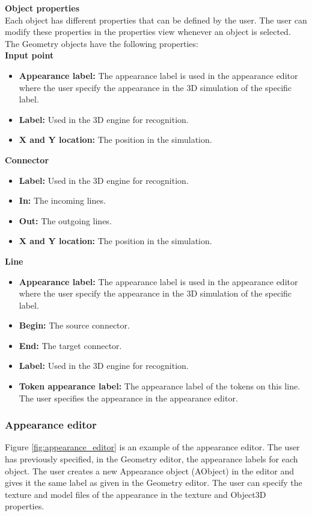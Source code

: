 \textbf{Object properties} \\
Each object has different properties that can be defined by the user. The user can modify these properties in the properties view whenever an object is selected. The Geometry objects have the following properties: \\
\textbf{Input point}
\begin{itemize}
\item{\textbf{Appearance label:} The appearance label is used in the appearance editor where the user specify the appearance in the 3D simulation of the specific label.}
\item{\textbf{Label:} Used in the 3D engine for recognition.}
\item{\textbf{X and Y location:} The position in the simulation.}
\end{itemize}
\textbf{Connector}
\begin{itemize}
\item{\textbf{Label:} Used in the 3D engine for recognition.}
\item{\textbf{In:} The incoming lines.}
\item{\textbf{Out:} The outgoing lines.}
\item{\textbf{X and Y location:} The position in the simulation.}
\end{itemize}
\textbf{Line}
\begin{itemize}
\item{\textbf{Appearance label:} The appearance label is used in the appearance editor where the user specify the appearance in the 3D simulation of the specific label.}
\item{\textbf{Begin:} The source connector.}
\item{\textbf{End:} The target connector.}
\item{\textbf{Label:} Used in the 3D engine for recognition.}
\item{\textbf{Token appearance label:} The appearance label of the tokens on this line. The user specifies the appearance in the appearance editor.}
\end{itemize}

\subsubsection{Appearance editor}
Figure \ref{fig:appearance_editor} is an example of the appearance editor. The user has previously specified, in the Geometry editor, the appearance labels for each object. The user creates a new Appearance object (AObject) in the editor and gives it the same label as given in the Geometry editor. The user can specify the texture and model files of the appearance in the texture and Object3D properties.

